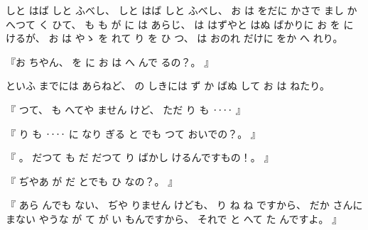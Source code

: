 
%
しと
はば
しと
ふべし、
%
しと
はば
しと
ふべし、
%
お
は
をだに
かさで
まし
かへつて
く
ひて、
%
も
も%
が
に
は
あらじ、
%
は
はずやと
はぬ
ばかりに
お
を
に
けるが、
%
お
は
やゝ
を
れて
り
を
ひ
つ、
%
は
おのれ
だけに
をか
へ
れり。

%
『お
ちやん、
%
を
に
お
は
へ
んで
るの？。
』

%
といふ
までには
あらねど、
%
の
しきには
ず
か
ばぬ%
して
お
は
ねたり。

%
『
つて、
%
も
へてや
ません
けど、
%
ただ%
り
も
‥‥
』

%
『
り
も
‥‥
に
なり
ぎる
と
でも
つて
おいでの？。
』

%
『
。
%
だつて
も
だ
だつて
り
ばかし
けるんですもの！。
』

%
『
ぢやあ
が
だ
とでも
ひ
なの？。
』

%
『
あら
んでも
ない、
%
ぢや
りません
けども、
%
り
ね
ね%
ですから、
%
だか
さんに
まない
やうな
が
て
が
い
もんですから、
%
それで
と
へて
た
んですよ。
』

